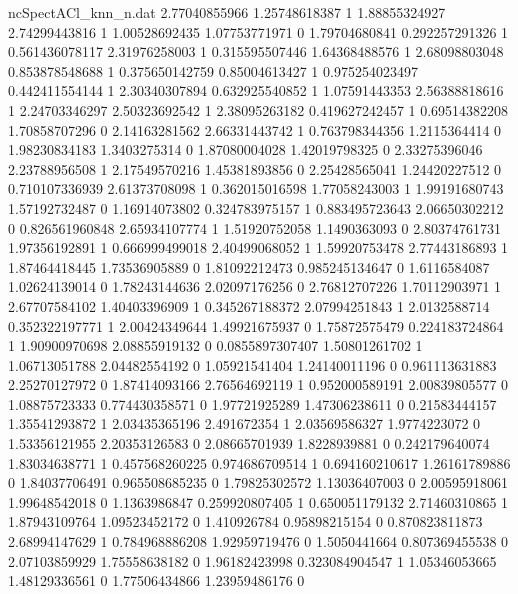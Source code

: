\begin{filecontents}{ncSpectACl_knn_n.dat}
2.77040855966 1.25748618387 1
1.88855324927 2.74299443816 1
1.00528692435 1.07753771971 0
1.79704680841 0.292257291326 1
0.561436078117 2.31976258003 1
0.315595507446 1.64368488576 1
2.68098803048 0.853878548688 1
0.375650142759 0.85004613427 1
0.975254023497 0.442411554144 1
2.30340307894 0.632925540852 1
1.07591443353 2.56388818616 1
2.24703346297 2.50323692542 1
2.38095263182 0.419627242457 1
0.69514382208 1.70858707296 0
2.14163281562 2.66331443742 1
0.763798344356 1.2115364414 0
1.98230834183 1.3403275314 0
1.87080004028 1.42019798325 0
2.33275396046 2.23788956508 1
2.17549570216 1.45381893856 0
2.25428565041 1.24420227512 0
0.710107336939 2.61373708098 1
0.362015016598 1.77058243003 1
1.99191680743 1.57192732487 0
1.16914073802 0.324783975157 1
0.883495723643 2.06650302212 0
0.826561960848 2.65934107774 1
1.51920752058 1.1490363093 0
2.80374761731 1.97356192891 1
0.666999499018 2.40499068052 1
1.59920753478 2.77443186893 1
1.87464418445 1.73536905889 0
1.81092212473 0.985245134647 0
1.6116584087 1.02624139014 0
1.78243144636 2.02097176256 0
2.76812707226 1.70112903971 1
2.67707584102 1.40403396909 1
0.345267188372 2.07994251843 1
2.0132588714 0.352322197771 1
2.00424349644 1.49921675937 0
1.75872575479 0.224183724864 1
1.90900970698 2.08855919132 0
0.0855897307407 1.50801261702 1
1.06713051788 2.04482554192 0
1.05921541404 1.24140011196 0
0.961113631883 2.25270127972 0
1.87414093166 2.76564692119 1
0.952000589191 2.00839805577 0
1.08875723333 0.774430358571 0
1.97721925289 1.47306238611 0
0.21583444157 1.35541293872 1
2.03435365196 2.491672354 1
2.03569586327 1.9774223072 0
1.53356121955 2.20353126583 0
2.08665701939 1.8228939881 0
0.242179640074 1.83034638771 1
0.457568260225 0.974686709514 1
0.694160210617 1.26161789886 0
1.84037706491 0.965508685235 0
1.79825302572 1.13036407003 0
2.00595918061 1.99648542018 0
1.1363986847 0.259920807405 1
0.650051179132 2.71460310865 1
1.87943109764 1.09523452172 0
1.410926784 0.95898215154 0
0.870823811873 2.68994147629 1
0.784968886208 1.92959719476 0
1.5050441664 0.807369455538 0
2.07103859929 1.75558638182 0
1.96182423998 0.323084904547 1
1.05346053665 1.48129336561 0
1.77506434866 1.23959486176 0
\end{filecontents}
